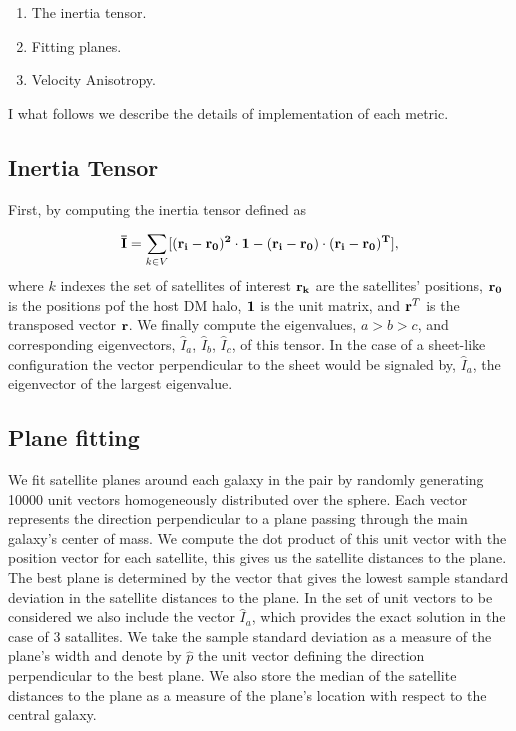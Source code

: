 \documentclass[a4paper,fleqn,usenatbib]{mnras}
\begin{document}
\begin{enumerate}
\item{The inertia tensor}.
\item{Fitting planes}.
\item{Velocity Anisotropy}.
\end{enumerate}

I what follows we describe the details of implementation of each
metric.


\subsection{Inertia Tensor}
\label{sub:inertia}
First, by computing the inertia tensor defined as 

\begin{equation}
{\bf{\bar{I}}} = \sum_{k \in V}[(\bf{r}_i - \bf{r}_0)^2\cdot \bf{1} -
  (\bf{r}_i-\bf{r}_0)\cdot (\bf{r}_i - \bf{r}_0)^{T}],
\end{equation}
%
where $k$ indexes the set of satellites of interest
$\bf{r}_k$ are the satellites' positions, $\bf{r}_{0}$ is the
positions pof the host DM halo, $\bf{1}$ is the unit matrix,  and
${\bf r}^T$ is the transposed vector $\bf{r}$. 
We finally compute the eigenvalues, $a>b>c$, and corresponding
eigenvectors, $\hat{I}_a$, $\hat{I}_b$, $\hat{I}_c$, of this tensor.
In the case of a sheet-like configuration the vector perpendicular to
the sheet would be signaled by, $\hat{I}_a$, the eigenvector of the
largest eigenvalue. 


\subsection{Plane fitting}
\label{sub:planes}

We fit satellite planes around each galaxy in the pair by randomly
generating 10000 unit vectors homogeneously distributed over the
sphere.
Each vector represents the direction perpendicular to a plane passing through
the main galaxy's center of mass. 
We compute the dot product of this unit vector with the position vector
for each satellite, this gives us the satellite distances to the
plane. 
The best plane is determined by the vector that gives the lowest
sample standard deviation in the satellite distances to the plane.
In the set of unit vectors to be considered we also include the vector
$\hat{I}_a$, which provides the exact solution in the case of $3$
satallites. 
We take the sample standard deviation as a measure of the plane's width
and denote by $\hat{p}$ the unit vector defining the direction
perpendicular to the best plane.
We also store the median of the satellite distances to the plane as a
measure of the plane's location with respect to the central galaxy.
\end{document}
